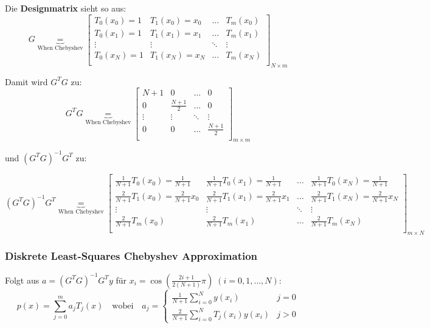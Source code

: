 \newpage

Die \textbf{Designmatrix} sieht so aus:
$$G \underbrace{=}_{\text{When Chebyshev}} 
\begin{bmatrix}
  T_0(x_0) = 1 & T_1(x_0) = x_0 & \ldots & T_m(x_0) \\
  T_0(x_1) = 1 & T_1(x_1) = x_1 & \ldots & T_m(x_1)\\
  \vdots & \vdots  & \ddots & \vdots\\
  T_0(x_N) = 1 & T_1(x_N) =x_N & \ldots & T_m(x_N)\\
\end{bmatrix}_{N \times m}$$

Damit wird $G^T G$ zu:
$$G^T G \underbrace{=}_{\text{When Chebyshev}} 
\begin{bmatrix}
  N+1 & 0 & \ldots & 0 \\
  0   & \frac{N+1}{2} & \ldots & 0\\
  \vdots  & \vdots & \ddots & \vdots\\
  0   & 0 & \ldots & \frac{N+1}{2}\\
\end{bmatrix}_{m \times m}$$

und $(G^T G)^{-1} G^T$ zu:

$$(G^T G)^{-1} G^T \underbrace{=}_{\text{When Chebyshev}} 
\begin{bmatrix}
  \frac{1}{N+1} T_0(x_0) = \frac{1}{N+1} & \frac{1}{N+1} T_0(x_1) = \frac{1}{N+1} & \ldots & \frac{1}{N+1} T_0(x_N) = \frac{1}{N+1} \\
  \frac{2}{N+1} T_1(x_0) = \frac{2}{N+1} x_0 & \frac{2}{N+1} T_1(x_1) = \frac{2}{N+1} x_1 & \ldots & \frac{2}{N+1} T_1(x_N) = \frac{2}{N+1}x_N\\
  \vdots & \vdots  & \ddots & \vdots\\
  \frac{2}{N+1} T_m(x_0) & \frac{2}{N+1} T_m(x_1) & \ldots & \frac{2}{N+1} T_m(x_N)\\
\end{bmatrix}_{m \times N}$$

\subsubsection{Diskrete Least-Squares Chebyshev Approximation}
Folgt aus $a=(G^T G)^{-1} G^T y$ für $x_i=\cos(\frac{2i+1}{2(N+1)}\pi)\;(i=0,1,\ldots,N)$:
$$p(x) = \sum_{j=0}^m a_j T_j(x) \quad \text{wobei} \quad
a_j = \begin{cases}
  \frac{1}{N+1} \sum_{i=0}^N y(x_i) & j = 0\\
  \frac{2}{N+1} \sum_{i=0}^N T_j(x_i) y(x_i) & j > 0 
\end{cases}$$

